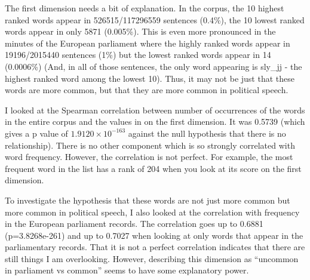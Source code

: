 \documentclass[eric_thesis.tex]{subfiles}
\begin{document}
The first dimension needs a bit of explanation. In the corpus, the 10 highest 
ranked words appear in 526515/117296559 sentences (0.4\%), the 10 lowest 
ranked words appear in only 5871 (0.005\%). This is even more pronounced in the 
minutes of the European parliament where the highly ranked words appear in 
19196/2015440 sentences (1\%) but the lowest ranked words appear in 14 
(0.0006\%) (And, in all of those sentences, the only word appearing is 
sly\_jj - the highest ranked word among the lowest 10). Thus, it may not be 
just that these words are more common, but that they are more common in 
political speech.

I looked at the Spearman correlation between number of occurrences of the words 
in the entire corpus and the values in on the first dimension. It was 0.5739 
(which gives a p value of $1.9120 \times 10^{-163}$ against the null hypothesis 
that there is no relationship). There is no other component which is so 
strongly correlated with word frequency. However, the correlation is not 
perfect. For example, the most frequent word in the list has a rank of 204 when 
you look at its score on the first dimension.

To investigate the hypothesis that these words are not just more common but 
more common in political speech, I also looked at the correlation with 
frequency in the European parliament records. The correlation goes up to 0.6881 
(p=3.8268e-261) and up to 0.7027 when looking at only words that appear in the 
parliamentary records. That it is not a perfect correlation indicates that 
there are still things I am overlooking. However, describing this dimension as 
``uncommon in parliament vs common'' seems to have some explanatory power.
\end{document}
